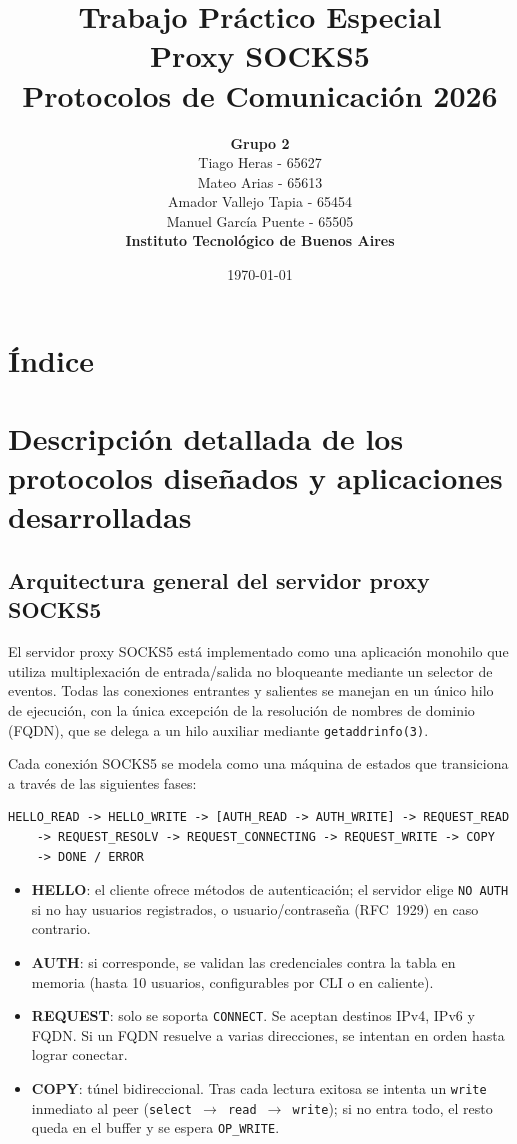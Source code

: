 \documentclass[12pt,a4paper]{article}
\title{\textbf{Trabajo Práctico Especial}\\[1cm]
       \Large{Proxy SOCKS5}\\[0.3cm]
       \large{Protocolos de Comunicación 2026}}
\author{\textbf{Grupo 2}\\[0.3cm]
        Tiago Heras - 65627 \\[0.1cm]
        Mateo Arias - 65613\\[0.1cm]
        Amador Vallejo Tapia - 65454\\[0.1cm]
        Manuel García Puente - 65505\\[8cm]
        \textbf{Instituto Tecnológico de Buenos Aires}}
\date{\today}
\begin{document}
\maketitle
\thispagestyle{empty}
\newpage

\section*{Índice}
\tableofcontents
\newpage

\section{Descripción detallada de los protocolos diseñados y aplicaciones desarrolladas}

\subsection{Arquitectura general del servidor proxy SOCKS5}

El servidor proxy SOCKS5 está implementado como una aplicación monohilo que utiliza
multiplexación de entrada/salida no bloqueante mediante un selector de eventos.
Todas las conexiones entrantes y salientes se manejan en un único hilo de ejecución,
con la única excepción de la resolución de nombres de dominio (FQDN), que se delega
a un hilo auxiliar mediante \texttt{getaddrinfo(3)}.

Cada conexión SOCKS5 se modela como una máquina de estados que transiciona a través
de las siguientes fases:

\begin{verbatim}
HELLO_READ -> HELLO_WRITE -> [AUTH_READ -> AUTH_WRITE] -> REQUEST_READ
    -> REQUEST_RESOLV -> REQUEST_CONNECTING -> REQUEST_WRITE -> COPY
    -> DONE / ERROR
\end{verbatim}

\begin{itemize}
    \item \textbf{HELLO}: el cliente ofrece métodos de autenticación; el servidor
          elige \texttt{NO AUTH} si no hay usuarios registrados, o usuario/contraseña
          (RFC~1929) en caso contrario.
    \item \textbf{AUTH}: si corresponde, se validan las credenciales contra la tabla
          en memoria (hasta 10 usuarios, configurables por CLI o en caliente).
    \item \textbf{REQUEST}: solo se soporta \texttt{CONNECT}. Se aceptan destinos
          IPv4, IPv6 y FQDN. Si un FQDN resuelve a varias direcciones, se intentan
          en orden hasta lograr conectar.
    \item \textbf{COPY}: túnel bidireccional. Tras cada lectura exitosa se intenta
          un \texttt{write} inmediato al peer (\texttt{select $\rightarrow$ read
          $\rightarrow$ write}); si no entra todo, el resto queda en el buffer y se
          espera \texttt{OP\_WRITE}.
\end{itemize}
\end{document}
